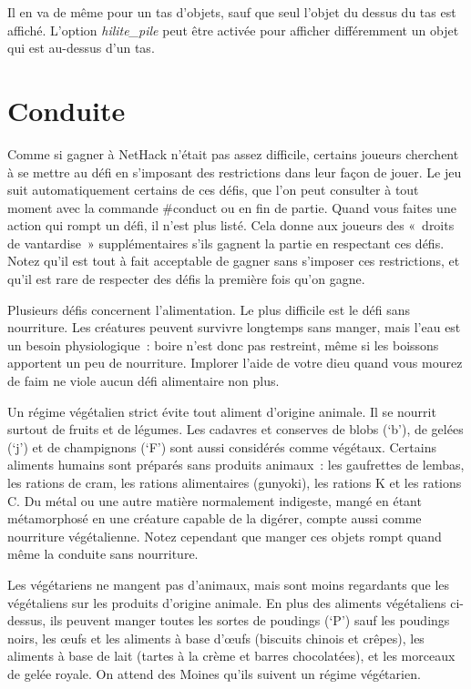 \documentclass[titlepage]{article}
\begin{document}
Il en va de même pour un tas d'objets, sauf que seul l'objet du dessus du
tas est affiché.
L'option
\textit{hilite\_pile}
peut être activée pour afficher différemment un objet qui est au-dessus
d'un tas.

\section{Conduite}



Comme si gagner à NetHack n'était pas assez difficile, certains joueurs
cherchent à se mettre au défi en s'imposant des restrictions dans leur
façon de jouer.
Le jeu suit automatiquement certains de ces défis, que l'on peut consulter
à tout moment avec la commande \#conduct ou en fin de partie.
Quand vous faites une action qui rompt un défi, il n'est plus listé.
Cela donne aux joueurs des «~droits de vantardise~» supplémentaires
s'ils gagnent la partie en respectant ces défis.
Notez qu'il est tout à fait acceptable de gagner sans s'imposer ces
restrictions, et qu'il est rare de respecter des défis la première fois
qu'on gagne.


Plusieurs défis concernent l'alimentation.
Le plus difficile est le défi sans nourriture.
Les créatures peuvent survivre longtemps sans manger, mais l'eau est un
besoin physiologique~: boire n'est donc pas restreint, même si les
boissons apportent un peu de nourriture.
Implorer l'aide de votre dieu quand vous mourez de faim ne viole aucun
défi alimentaire non plus.


Un régime végétalien strict évite tout aliment d'origine animale.
Il se nourrit surtout de fruits et de légumes.
Les cadavres et conserves de blobs (`b'), de gelées (`j') et de
champignons (`F') sont aussi considérés comme végétaux.
Certains aliments humains sont préparés sans produits animaux~: les
gaufrettes de lembas, les rations de cram, les rations alimentaires
(gunyoki), les rations K et les rations C.
Du métal ou une autre matière normalement indigeste, mangé en étant
métamorphosé en une créature capable de la digérer, compte aussi comme
nourriture végétalienne.
Notez cependant que manger ces objets rompt quand même la conduite sans
nourriture.


Les végétariens ne mangent pas d'animaux, mais sont moins regardants que
les végétaliens sur les produits d'origine animale.
En plus des aliments végétaliens ci-dessus, ils peuvent manger toutes les
sortes de poudings (`P') sauf les poudings noirs, les œufs et les
aliments à base d'œufs (biscuits chinois et crêpes), les aliments à base
de lait (tartes à la crème et barres chocolatées), et les morceaux de
gelée royale.
On attend des Moines qu'ils suivent un régime végétarien.
\end{document}
